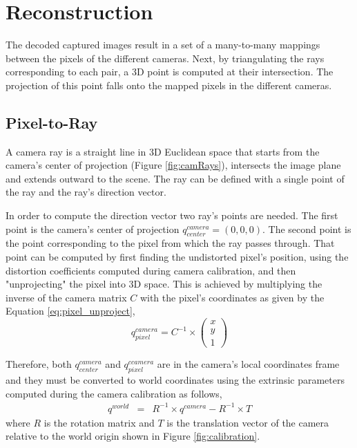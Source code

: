 \documentclass[final,12pt,3p]{elsarticle}
\begin{document}
\section{Reconstruction}
\label{sec:reconstruction}

The decoded captured images result in a set of a many-to-many mappings between the pixels of the different cameras. Next, by triangulating the rays corresponding to each pair, a 3D point is computed at their intersection. The projection of this point falls onto the mapped pixels in the different cameras.

\subsection{Pixel-to-Ray}
\label{subsec:pixel_to_ray}
A camera ray is a straight line in 3D Euclidean space that starts from the camera's center of projection (Figure \ref{fig:camRays}), intersects the image plane and extends outward to the scene. The ray can be defined with a single point of the ray and the ray's direction vector. 

In order to compute the direction vector two ray's points are needed. The first point is the camera's center of projection $q_{center}^{camera} = (0,0,0)$. The second point is the point corresponding to the pixel from which the ray passes through. That point can be computed by first finding the undistorted pixel's position, using the distortion coefficients computed during camera calibration, and then "unprojecting" the pixel into 3D space. This is achieved by multiplying the inverse of the camera matrix $C$ with the pixel's coordinates as given by the Equation \ref{eq:pixel_unproject},
\begin{equation}
q_{pixel}^{camera} = C^{-1} \times \begin{pmatrix}
x \\ 
y \\ 
1
\end{pmatrix}
\label{eq:pixel_unproject}
\end{equation}

Therefore, both $q_{center}^{camera}$ and $q_{pixel}^{ccamera}$ are in the camera's local coordinates frame and they must be converted to world coordinates using the extrinsic parameters computed during the camera calibration as follows,
\begin{equation}
	\begin{array}{lcl}
		q^{world} & = & R^{-1} \times q^{camera} - R^{-1} \times T
	\end{array}
	\label{eq:cam2world}
\end{equation}
where $R$ is the rotation matrix and $T$ is the translation vector of the camera relative to the world origin shown in Figure \ref{fig:calibration}.
\end{document}
